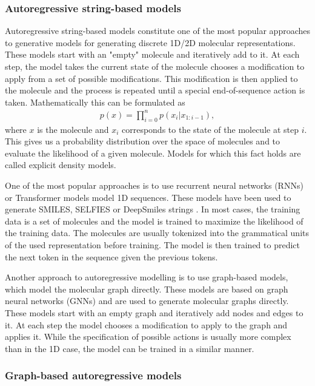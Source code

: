 \subsubsection{Autoregressive string-based models}
Autoregressive string-based models constitute one of the most popular approaches to generative
models for generating discrete 1D/2D molecular representations. These models start with an "empty"
molecule and iteratively add to it. At each step, the model takes the current state of the molecule
chooses a modification to apply from a set of possible modifications. This modification is then
applied to the molecule and the process is repeated until a special end-of-sequence action is taken.
Mathematically this can be formulated as
\begin{align}
      p(x) = \prod_{i=0}^n p(x_i | x_{1:i-1}),
\end{align}
where $x$ is the molecule and $x_i$ corresponds to the state of the molecule at step $i$. This gives
us a probability distribution over the space of molecules and to evaluate the likelihood of a given
molecule. Models for which this fact holds are called explicit density models.

One of the most popular approaches is to use recurrent neural networks (RNNs) or Transformer models
\citep{vaswaniAttentionAllYou2017} model 1D sequences. These models have been used to generate
SMILES, SELFIES or DeepSmiles strings \citep{seglerGeneratingFocusedMolecule2018,todo}. In most
cases, the training data is a set of molecules and the model is trained to maximize the likelihood
of the training data. The molecules are usually tokenized into the grammatical units of the used
representation before training. The model is then trained to predict the next token in the sequence
given the previous tokens.

Another approach to autoregressive modelling is to use graph-based models, which model the molecular
graph directly. These models are based on graph neural networks (GNNs) and are used to generate
molecular graphs directly. These models start with an empty graph and iteratively add nodes and
edges to it. At each step the model chooses a modification to apply to the graph and applies it.
While the specification of possible actions is usually more complex than in the 1D case, the model
can be trained in a similar manner.

\subsubsection{Graph-based autoregressive models}

